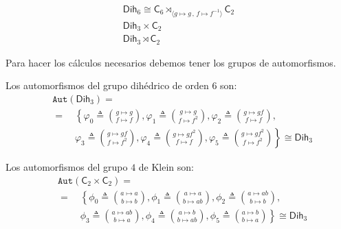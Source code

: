\documentclass[final,12pt,a4paper,twoside,fleqn]{extbook}
\newcommand{\grclass}[1]{\ensuremath{\mathsf{#1}}}
\newcommand{\cyclicgr}[1]{\ensuremath{{\grclass{C}}_{#1}}}
\theoremstyle{definition}
\theoremstyle{remark}
\begin{document}
\begin{align}
\mathsf{Dih}_{6}                  \cong                  \cyclicgr{6}\rtimes_{\langle{g                  \mapsto g\,,\,f                  \mapsto f^{-1}}\rangle} \cyclicgr{2}\\
\mathsf{Dih}_{3}                   \times                   \cyclicgr{2}\\
\mathsf{Dih}_{3} \rtimes \cyclicgr{2}
\end{align}

Para hacer los c\'alculos necesarios debemos tener los grupos de automorfismos.

Los automorfismos del grupo dih\'edrico de orden $6$ son:
\begin{align}
&\texttt{Aut}(\mathsf{Dih}_{3})=\nonumber\\
&=\quad
    \left\lbrace \right.
        \varphi_0\triangleq\binom{g                  \mapsto g}{f                  \mapsto f},
        \varphi_1\triangleq\binom{g                  \mapsto g}{f                  \mapsto f^2},
        \varphi_2\triangleq\binom{g                  \mapsto gf}{f                  \mapsto f},\nonumber\\
&\phantom{=}\quad\varphi_3\triangleq\binom{g                  \mapsto gf}{f                  \mapsto f^2}, 			
	\varphi_4\triangleq\binom{g                  \mapsto gf^2}{f
	                  \mapsto f}, \varphi_5\triangleq\binom{g                  \mapsto gf^2}{f                  \mapsto f^2}
    \left. \right\rbrace\nonumber                   \cong                   \mathsf{Dih}_{3}
\end{align}

Los automorfismos del grupo $4$ de Klein son:
\begin{align}
&\texttt{Aut}(\cyclicgr{2}                  \times                  \cyclicgr{2})=\nonumber\\
&=\quad
	\left\lbrace \right.
	\phi_0\triangleq\binom{a                  \mapsto a}{b                  \mapsto b},
	\phi_1\triangleq\binom{a                  \mapsto a}{b                  \mapsto ab},
	\phi_2\triangleq\binom{a                  \mapsto ab}{b                  \mapsto b},\nonumber\\
&\phantom{=}\quad
	\phi_3\triangleq\binom{a                  \mapsto ab}{b                  \mapsto a}, 			
	\phi_4\triangleq\binom{a                  \mapsto b}{b                  \mapsto ab},
	\phi_5\triangleq\binom{a                  \mapsto b}{b                  \mapsto a}
	\left. \right\rbrace\nonumber                   \cong                   \mathsf{Dih}_{3}
\end{align}
\end{document}
